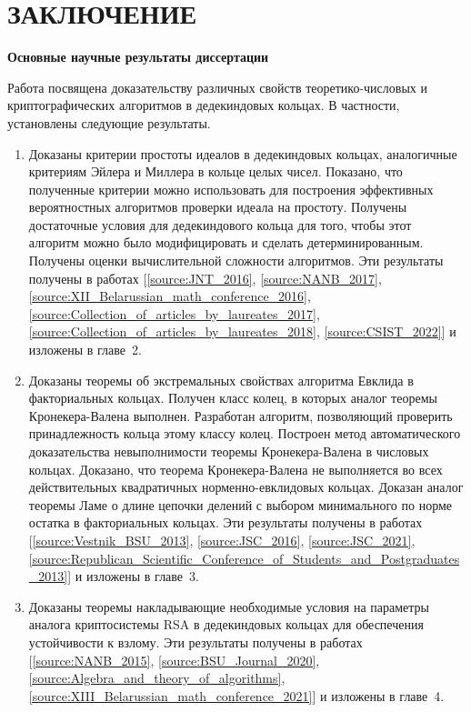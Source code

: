 \documentclass[_00_autoref.tex]{subfiles}
\begin{document}
{\let\clearpage\relax\vspace{2.2ex}
\chapter*{\MakeUppercase{ЗАКЛЮЧЕНИЕ}}\vspace{-3ex}}

\centerline{\textbf{Основные научные результаты диссертации}}

Работа посвящена доказательству различных свойств теоретико-числовых и криптографических алгоритмов в дедекиндовых кольцах.
В частности, установлены следующие результаты.
\begin{enumerate}
    \item Доказаны критерии простоты идеалов в дедекиндовых кольцах, аналогичные критериям Эйлера и Миллера в кольце целых чисел.
    Показано, что полученные критерии можно использовать для построения эффективных вероятностных алгоритмов проверки идеала на простоту.
    Получены достаточные условия для дедекиндового кольца для того, чтобы этот алгоритм можно было модифицировать и сделать детерминированным.
    Получены оценки вычислительной сложности алгоритмов.
    Эти результаты получены в работах [\ref{source:JNT_2016}, \ref{source:NANB_2017}, \ref{source:XII_Belarussian_math_conference_2016}, \ref{source:Collection_of_articles_by_laureates_2017}, \ref{source:Collection_of_articles_by_laureates_2018}, \ref{source:CSIST_2022}] и изложены в главе~2.

    \item Доказаны теоремы об экстремальных свойствах алгоритма Евклида в факториальных кольцах.
    Получен класс колец, в которых аналог теоремы Кронекера-Валена выполнен.
    Разработан алгоритм, позволяющий проверить принадлежность кольца этому классу колец.
    Построен метод автоматического доказательства невыполнимости теоремы Кронекера-Валена в числовых кольцах.
    Доказано, что теорема Кронекера-Валена не выполняется во всех действительных квадратичных норменно-евклидовых кольцах.
    Доказан аналог теоремы Ламе о длине цепочки делений с выбором минимального по норме остатка в факториальных кольцах.
    Эти результаты получены в работах [\ref{source:Vestnik_BSU_2013}, \ref{source:JSC_2016}, \ref{source:JSC_2021}, \ref{source:Republican_Scientific_Conference_of_Students_and_Postgraduates_2013}] и изложены в главе~3.

    \item Доказаны теоремы накладывающие необходимые условия на параметры аналога криптосистемы RSA в дедекиндовых кольцах для обеспечения устойчивости к взлому.
    Эти результаты получены в работах [\ref{source:NANB_2015}, \ref{source:BSU_Journal_2020}, \ref{source:Algebra_and_theory_of_algorithms}, \ref{source:XIII_Belarussian_math_conference_2021}] и изложены в главе~4.
\end{enumerate}
\end{document}
